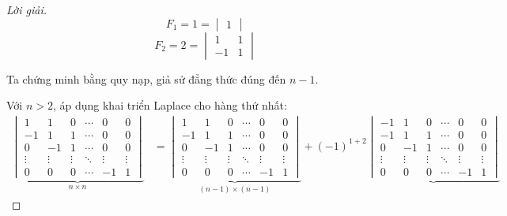 \documentclass[class=nhvh-linear-algebra,crop=false]{standalone}
\begin{document}
\begin{proof}[Lời giải]
	\[
		F_{1} = 1 = \begin{vmatrix}1\end{vmatrix}
	\]
	\[
		F_{2} = 2 = \begin{vmatrix}1 & 1 \\ -1 & 1 \end{vmatrix}
	\]
	\par Ta chứng minh bằng quy nạp, giả sử đẳng thức đúng đến $n-1$.
	\par Với $n > 2$, áp dụng khai triển Laplace cho hàng thứ nhất:
	\begingroup{}
	\allowdisplaybreaks{}
	\begin{align*}
		\underbrace{\begin{vmatrix}
				            1      & 1      & 0      & \cdots & 0      & 0      \\
				            -1     & 1      & 1      & \cdots & 0      & 0      \\
				            0      & -1     & 1      & \cdots & 0      & 0      \\
				            \vdots & \vdots & \vdots & \ddots & \vdots & \vdots \\
				            0      & 0      & 0      & \cdots & -1     & 1
			            \end{vmatrix}}_{n\times n}
		 & =
		\underbrace{\begin{vmatrix}
				            1      & 1      & 0      & \cdots & 0      & 0      \\
				            -1     & 1      & 1      & \cdots & 0      & 0      \\
				            0      & -1     & 1      & \cdots & 0      & 0      \\
				            \vdots & \vdots & \vdots & \ddots & \vdots & \vdots \\
				            0      & 0      & 0      & \cdots & -1     & 1
			            \end{vmatrix}}_{(n-1)\times (n-1)}
		+
		{(-1)}^{1+2}
		\underbrace{\begin{vmatrix}
				            -1     & 1      & 0      & \cdots & 0      & 0      \\
				            -1     & 1      & 1      & \cdots & 0      & 0      \\
				            0      & -1     & 1      & \cdots & 0      & 0      \\
				            \vdots & \vdots & \vdots & \ddots & \vdots & \vdots \\
				            0      & 0      & 0      & \cdots & -1     & 1

\end{vmatrix}}
\end{align*}
\end{proof}
\end{document}
